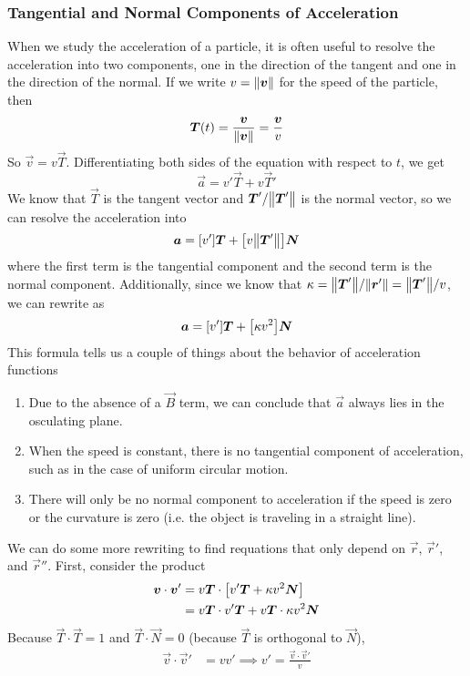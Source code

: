 \subsubsection{Tangential and Normal Components of Acceleration}
When we study the acceleration of a particle, it is often useful to resolve the acceleration into two components, one in the direction of the tangent and one in the direction of the normal. If we write \(v = \norm{\boldsymbol{v}}\) for the speed of the particle, then 
\[ \boldsymbol{T}(t) = \frac{\boldsymbol{v}}{\norm{\boldsymbol{v}}} = \frac{\boldsymbol{v}}{v}\]
So \( \vec v = v\vec T\). Differentiating both sides of the equation with respect to \(t\), we get
\[ \vec a = v'\vec T + v\vec T'\]
We know that \(\vec T\) is the tangent vector and \(\boldsymbol{T}'/\norm{\boldsymbol{T}'}\) is the normal vector, so we can resolve the acceleration into
\[ \vec a = \bqty{v'}\vec T + \bqty{v\norm{\vec T'}}\vec N\]
where the first term is the tangential component and the second term is the normal component. Additionally, since we know that \(\kappa = \norm{\boldsymbol{T}'}/\norm{\boldsymbol{r}'} = \norm{\boldsymbol{T}'}/v\), we can rewrite as 
\[ \vec a = \bqty{v'}\vec T + \bqty{\kappa v^2} \vec N \]
This formula tells us a couple of things about the behavior of acceleration functions
\begin{enumerate}
    \item Due to the absence of a \(\vec B\) term, we can conclude that \(\vec a\) always lies in the osculating plane. 
    \item When the speed is constant, there is no tangential component of acceleration, such as in the case of uniform circular motion.
    \item There will only be no normal component to acceleration if the speed is zero or the curvature is zero (i.e. the object is traveling in a straight line).
\end{enumerate}
We can do some more rewriting to find requations that only depend on \(\vec r\), \(\vec r'\), and \(\vec r''\). First, consider the product 
\begin{align*}
    \vec v \cdot \vec v' &= v\vec T \cdot \bqty{v'\vec T + \kappa v^2\vec N} \\
    &= v\vec T \cdot v'\vec T + v\vec T \cdot \kappa v^2\vec N
\end{align*}
Because \(\vec T \cdot \vec T = 1\) and \(\vec T \cdot \vec N = 0\) (because \(\vec T\) is orthogonal to \(\vec N\)),
\begin{align*}
    \vec v \cdot \vec v' &= vv' \implies v' = \frac{\vec v\cdot \vec v'}{v}
\end{align*}
